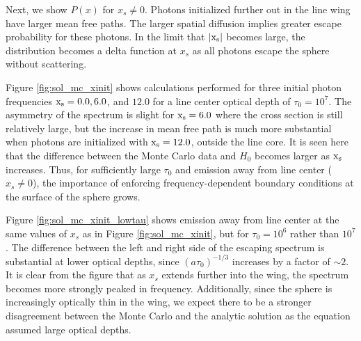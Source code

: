\documentclass{aastex63}
\begin{document}
Next, we show $P(x)$ for $x_s \neq 0$. Photons initialized further out in the line wing have larger mean free paths. The larger spatial diffusion implies greater escape probability for these photons. In the limit that $|\rm x_s|$ becomes large, the distribution becomes a delta function at $x_s$ as all photons escape the sphere without scattering. 

Figure \ref{fig:sol_mc_xinit} shows calculations performed for three initial photon frequencies $\rm x_s = 0.0, 6.0$, and $12.0$ for a line center optical depth of $\tau_0=10^7$. The asymmetry of the spectrum is slight for $\rm x_s = 6.0$ where the cross section is still relatively large, but the increase in mean free path is much more substantial when photons are initialized with $\rm x_s=12.0$, outside the line core. It is seen here that the difference between the Monte Carlo data and $H_0$ becomes larger as $\rm x_s$ increases. Thus, for sufficiently large $\tau_0$ and emission away from line center ($x_s \neq 0$), the importance of enforcing frequency-dependent boundary conditions at the surface of the sphere grows. 

Figure \ref{fig:sol_mc_xinit_lowtau} shows emission away from line center at the same values of $x_s$ as in Figure \ref{fig:sol_mc_xinit}, but for $\tau_0=10^6$ rather than $10^7$. The difference between the left and right side of the escaping spectrum is substantial at lower optical depths, since $(a\tau_0)^{-1/3}$ increases by a factor of ${\sim}2$. It is clear from the figure that as $x_s$ extends further into the wing, the spectrum becomes more strongly peaked in frequency. Additionally, since the sphere is increasingly optically thin in the wing, we expect there to be a stronger disagreement between the Monte Carlo and the analytic solution as the equation assumed large optical depths.
\end{document}
